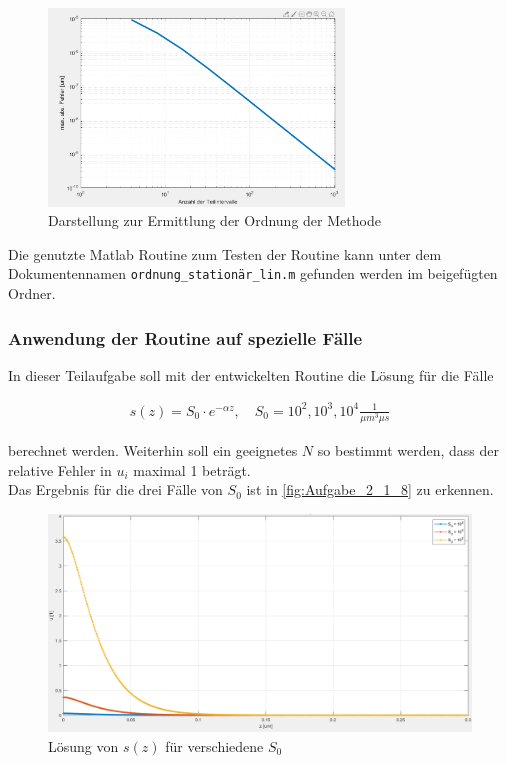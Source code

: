 \documentclass[
	pagesize,
	fontsize=12pt,
	paper=a4,
	oneside,
   reqno
]{scrartcl}
\begin{document}
\begin{figure}[H]
   \centering
   \includegraphics[width=0.7\textwidth]{Bilder/Aufgabe_2_1_7_b.png}
   \caption[Ordnung der Methode linear stationär]{Darstellung zur Ermittlung der Ordnung der Methode}
   \label{fig:Aufgabe_2_1_7_b}
\end{figure}

Die genutzte Matlab Routine zum Testen der Routine kann unter dem Dokumentennamen \texttt{ordnung\_stationär\_lin.m} gefunden werden im beigefügten Ordner.

\subsubsection{Anwendung der Routine auf spezielle Fälle}

In dieser Teilaufgabe soll mit der entwickelten Routine die Lösung für die Fälle

\begin{align*}
   s(z) = S_0 \cdot e^{-\alpha z}, \quad S_0 = 10^2, 10^3, 10^4 \frac{1}{\mu m^3 \mu s}
\end{align*}

berechnet werden. Weiterhin soll ein geeignetes $N$ so bestimmt werden, dass der relative Fehler in $u_i$ maximal 1\textperthousand{} beträgt. \\

Das Ergebnis für die drei Fälle von $S_0$ ist in \autoref{fig:Aufgabe_2_1_8} zu erkennen.

\begin{figure}[H]
   \centering
   \includegraphics[width=1\textwidth]{Bilder/Aufgabe_2_1_8.png}
   \caption[Lösung von $s(z)$]{Lösung von $s(z)$ für verschiedene $S_0$}
   \label{fig:Aufgabe_2_1_8}
\end{figure}
\end{document}
